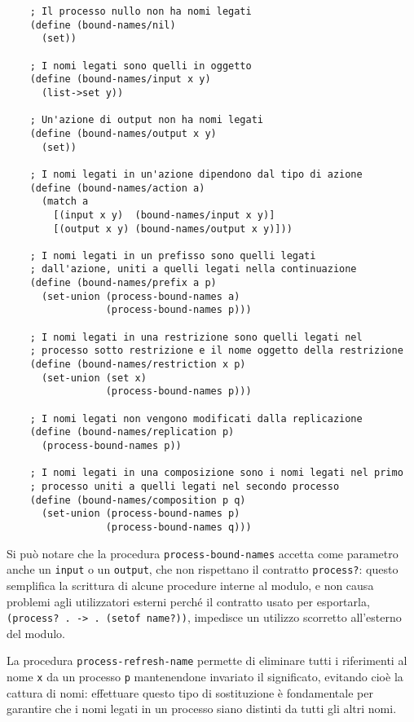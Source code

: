 \begin{lstlisting}
    ; Il processo nullo non ha nomi legati
    (define (bound-names/nil)
      (set))

    ; I nomi legati sono quelli in oggetto
    (define (bound-names/input x y)
      (list->set y))

    ; Un'azione di output non ha nomi legati
    (define (bound-names/output x y)
      (set))

    ; I nomi legati in un'azione dipendono dal tipo di azione
    (define (bound-names/action a)
      (match a
        [(input x y)  (bound-names/input x y)]
        [(output x y) (bound-names/output x y)]))

    ; I nomi legati in un prefisso sono quelli legati
    ; dall'azione, uniti a quelli legati nella continuazione
    (define (bound-names/prefix a p)
      (set-union (process-bound-names a)
                 (process-bound-names p)))

    ; I nomi legati in una restrizione sono quelli legati nel
    ; processo sotto restrizione e il nome oggetto della restrizione
    (define (bound-names/restriction x p)
      (set-union (set x)
                 (process-bound-names p)))

    ; I nomi legati non vengono modificati dalla replicazione
    (define (bound-names/replication p)
      (process-bound-names p))

    ; I nomi legati in una composizione sono i nomi legati nel primo
    ; processo uniti a quelli legati nel secondo processo
    (define (bound-names/composition p q)
      (set-union (process-bound-names p)
                 (process-bound-names q)))
\end{lstlisting}

Si pu\`o notare che la procedura \lstinline{process-bound-names} accetta
come parametro anche un \lstinline{input} o un \lstinline{output}, che
non rispettano il contratto \lstinline{process?}: questo semplifica la
scrittura di alcune procedure interne al modulo, e non causa problemi
agli utilizzatori esterni perch\'e il contratto usato per esportarla,
\lstinline{(process? . -> . (setof name?))}, impedisce un utilizzo scorretto
all'esterno del modulo.

La procedura \lstinline{process-refresh-name} permette di eliminare tutti
i riferimenti al nome \lstinline{x} da un processo \lstinline{p}
mantenendone invariato il significato, evitando cio\`e la cattura di nomi:
effettuare questo tipo di sostituzione \`e fondamentale per garantire che
i nomi legati in un processo siano distinti da tutti gli altri nomi.

